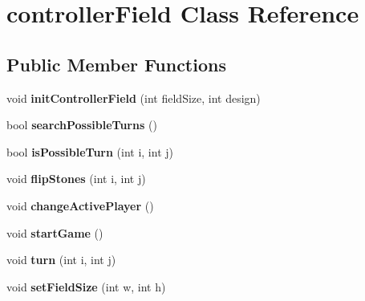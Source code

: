 \hypertarget{classcontrollerField}{\section{controller\+Field Class Reference}
\label{classcontrollerField}
}
\subsection*{Public Member Functions}
\begin{DoxyCompactItemize}
\item 
\hypertarget{classcontrollerField_a2470fb6d7d49526f1cc5a74ebe477234}{void {\bfseries init\+Controller\+Field} (int field\+Size, int design)}\label{classcontrollerField_a2470fb6d7d49526f1cc5a74ebe477234}

\item 
\hypertarget{classcontrollerField_af5ea0ce7129a859a26a9e47eb676ed74}{bool {\bfseries search\+Possible\+Turns} ()}\label{classcontrollerField_af5ea0ce7129a859a26a9e47eb676ed74}

\item 
\hypertarget{classcontrollerField_a23d84bb326c6d188bdfd787a3d573e35}{bool {\bfseries is\+Possible\+Turn} (int i, int j)}\label{classcontrollerField_a23d84bb326c6d188bdfd787a3d573e35}

\item 
\hypertarget{classcontrollerField_a91e1400e3e17f63781e3e5d276702897}{void {\bfseries flip\+Stones} (int i, int j)}\label{classcontrollerField_a91e1400e3e17f63781e3e5d276702897}

\item 
\hypertarget{classcontrollerField_aa63d05d6ed27a945e32607d7299086e8}{void {\bfseries change\+Active\+Player} ()}\label{classcontrollerField_aa63d05d6ed27a945e32607d7299086e8}

\item 
\hypertarget{classcontrollerField_ae87eed9581bf21f437c4af07d94c914a}{void {\bfseries start\+Game} ()}\label{classcontrollerField_ae87eed9581bf21f437c4af07d94c914a}

\item 
\hypertarget{classcontrollerField_a6c88a22260e3f476bb272137d659da99}{void {\bfseries turn} (int i, int j)}\label{classcontrollerField_a6c88a22260e3f476bb272137d659da99}

\item 
\hypertarget{classcontrollerField_a5fd8f7be14a74d45c551a02dfd9dc095}{void {\bfseries set\+Field\+Size} (int w, int h)}\label{classcontrollerField_a5fd8f7be14a74d45c551a02dfd9dc095}


\end{DoxyCompactItemize}
